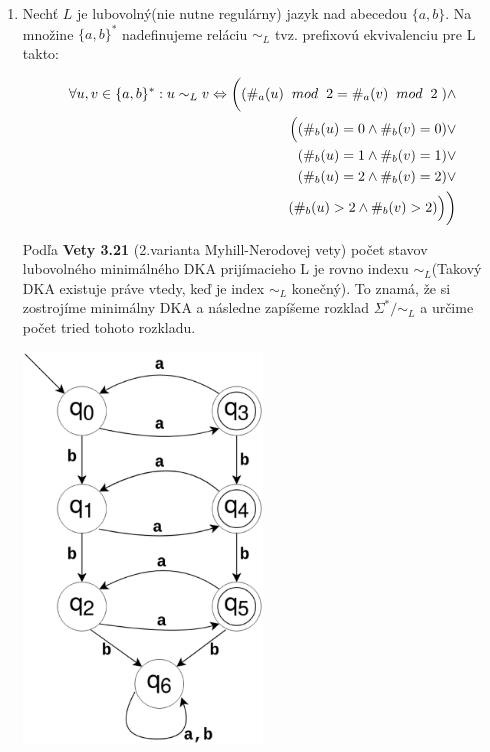 \documentclass[11pt,a4paper]{article}
\begin{document}
\begin{enumerate}
    \item Nechť $L$ je lubovolný(nie nutne regulárny) jazyk nad abecedou $\{ a,b \}$. Na množine $\{ a,b \}^*$ nadefinujeme reláciu $\sim_L$ tvz. prefixovú ekvivalenciu pre L takto: 

    \begin{equation*}
    \begin{aligned}
        \forall u, v \in \{a, b\}^*: u \sim_L v \Leftrightarrow \bigg( ( \#_a(u) \hspace{0.2cm}mod\hspace{0.2cm} 2 = \#_a(v) \hspace{0.2cm} mod \hspace{0.2cm} 2 \hspace{0.1cm} ) \land \\
        \Big( ( \#_b(u) = 0 \land \#_b(v) = 0 ) \lor \\ 
              ( \#_b(u) = 1 \land \#_b(v) = 1 ) \lor \\
              ( \#_b(u) = 2 \land \#_b(v) = 2 ) \lor \\
              ( \#_b(u) > 2 \land \#_b(v) > 2 ) \Big) \bigg)
    \end{aligned}
    \end{equation*}

    Podľa \textbf{Vety 3.21} (2.varianta Myhill-Nerodovej vety) počet stavov lubovolného minimálného DKA prijímacieho L je rovno indexu $\sim_L$(Takový DKA existuje práve vtedy, keď je index $\sim_L$ konečný). To znamá, že si zostrojíme minimálny DKA a následne zapíšeme rozklad $\Sigma^* / \sim_L$ a určime počet tried tohoto rozkladu.

    
    \begin{center}
        \includegraphics[width=0.5\textwidth]{5.eps}
    \end{center}
    \newpage


\end{enumerate}
\end{document}
